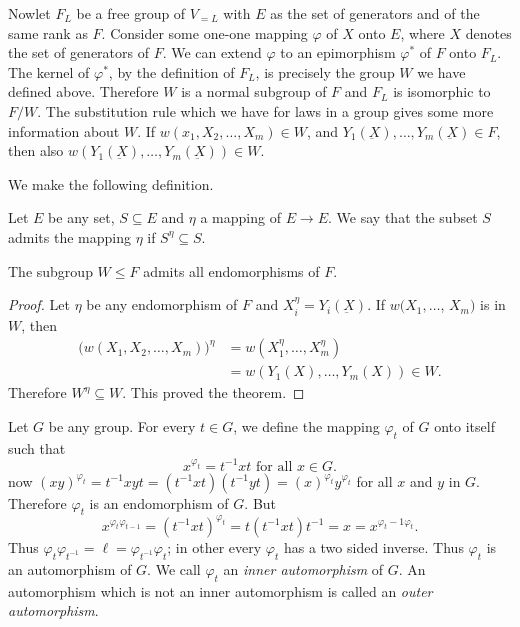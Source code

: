 Now\pageoriginale let $F_L$ be a free group of $V_{=L}$ with $E$ as the set of
generators and of the same rank as $F$. Consider some one-one mapping
$\varphi$ of $X$ onto $E$, where $X$ denotes the set of generators of
$F$. We can extend $\varphi$ to an epimorphism $\varphi^*$ of $F$ onto
$F_L$. The kernel of $\varphi^*$, by the definition of $F_L$, is
precisely the group $W$ we have defined above. Therefore $W$ is a
normal subgroup of $F$ and $F_L$ is isomorphic to $F/W$. The
substitution rule which we have for laws in a group gives some more
information about $W$. If $w(x_1, X_2, \ldots, X_m)\in  W$, and
$Y_1(\underbar{X}),\ldots,Y_m(\underbar{X}) \in  F$, then also
$w(Y_1(\underbar{X}),\ldots,Y_m(\underbar{X})) \in  W$.  
 
We make the following definition.

\begin{defi*}
  Let $E$ be any set, $S \subseteq E$ and $\eta$ a mapping of $E \to
  E$. We say that the subset $S$ admits the mapping $\eta$ if $S^\eta
  \subseteq S$. 
\end{defi*}
 
\setcounter{theorem}{0}
\begin{theorem}\label{chap5:sec5:thm1}%
  The subgroup $W \leq F$ admits all endomorphisms of $F$.
\end{theorem} 
 
\begin{proof}
  Let $\eta$ be any endomorphism of $F$ and $X^\eta_i =
  Y_i(\underbar{X})$. If $w(X_1,\ldots$, $X_m)$ is in $W$, then 
  \begin{align*}
    \bigg ( w(X_1,X_2,\ldots, X_m) \bigg) ^\eta & = w (X^\eta_1,\ldots
   , X^\eta_m)\\
    & = w(Y_1(X),\ldots, Y_m(X)) \in  W.
  \end{align*}
  Therefore $W^\eta \subseteq W$. This proved the theorem.
 \end{proof} 
 
Let $G$ be any group. For every $t \in  G$, we define the
mapping $\varphi_t$ of $G$ onto itself such that 
$$
x^{\varphi_t} = t^{-1} xt \text{ for all } x \in  G.
$$
now $(xy)^{\varphi_t}=t^{-1} x y t = (t^{-1}x t) (t^{-1} y
t)=(x)^{\varphi_t} y^{\varphi_t}$ for all $x$ and $y$ in\pageoriginale
$G$. Therefore $\varphi_t$ is an endomorphism of $G$. But 
$$
x^{\varphi_t \varphi_{t-1}} = (t^{-1}x t)^{\varphi_t} = t(t^{-1} x
t)t^{-1} = x = x^{\varphi_t -1 \varphi_t}. 
$$
Thus $\varphi_t \varphi_{t^{-1}} = \ell = \varphi_{t^{-1}} \varphi_t$; in
other every $\varphi_t$ has a two sided inverse. Thus $\varphi_t$ is
an automorphism of $G$. We call $\varphi_t$ an \textit{inner
  automorphism} of $G$. An automorphism which is not an inner
automorphism is called an \textit {outer automorphism}. 
  
